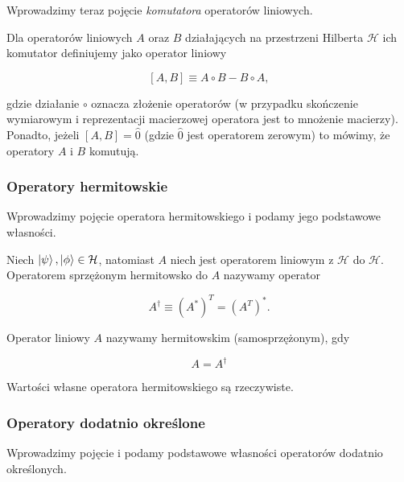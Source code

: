 Wprowadzimy teraz pojęcie \textit{komutatora} operatorów liniowych.

\begin{definition}[Komutator]
    Dla operatorów liniowych $A$ oraz $B$ działających na przestrzeni Hilberta $\mathcal{H}$ ich komutator definiujemy jako operator liniowy

    $$
        [A, B] \equiv A \circ B - B \circ A,
    $$

    gdzie działanie $\circ$ oznacza złożenie operatorów (w przypadku skończenie wymiarowym i reprezentacji macierzowej operatora jest to mnożenie macierzy). Ponadto, jeżeli $[A, B] = \hat{0}$ (gdzie $\hat{0}$ jest operatorem zerowym) to mówimy, że operatory $A$ i $B$ komutują.

\end{definition}

\subsubsection{Operatory hermitowskie}

Wprowadzimy pojęcie operatora hermitowskiego i podamy jego podstawowe własności.

\begin{definition}
    Niech $\ket{\psi}, \ket{\phi} \in \mathcal{H}$, natomiast $A$ niech jest operatorem liniowym z $\mathcal{H}$ do $\mathcal{H}$. Operatorem sprzężonym hermitowsko do $A$ nazywamy operator 

    $$
        A ^ {\dag} \equiv (A ^ {*}) ^ T = (A ^ {T}) ^ {*}.
    $$
\end{definition}

\begin{definition}
    Operator liniowy $A$ nazywamy hermitowskim (samosprzężonym), gdy

    $$
        A = A ^ {\dag}
    $$
\end{definition}

\begin{theorem}
    Wartości własne operatora hermitowskiego są rzeczywiste.
\end{theorem}

\subsubsection{Operatory dodatnio określone}

Wprowadzimy pojęcie i podamy podstawowe własności operatorów dodatnio określonych.


